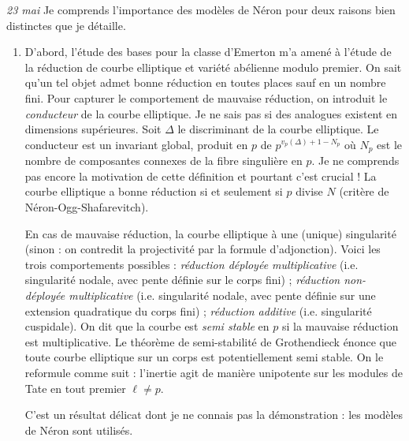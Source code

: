 \documentclass[11.8pt]{amsart}
\theoremstyle{plain}
\theoremstyle{definition}
\theoremstyle{remark}
\begin{document}
\textsl{23 mai} \quad Je comprends l'importance des modèles de Néron pour deux raisons bien distinctes que je détaille. \begin{enumerate}
\item D'abord, l'étude des bases pour la classe d'Emerton m'a amené à l'étude de la réduction de courbe elliptique et variété abélienne modulo premier. On sait qu'un tel objet admet bonne réduction en toutes places sauf en un nombre fini. Pour capturer le comportement de mauvaise réduction, on introduit le \textit{conducteur} de la courbe elliptique. Je ne sais pas si des analogues existent en dimensions supérieures. Soit $\Delta$ le discriminant de la courbe elliptique. Le conducteur est un invariant global, produit en $p$ de $p^{v_p(\Delta)+1-N_p}$ où $N_p$ est le nombre de composantes connexes de la fibre singulière en $p$. Je ne comprends pas encore la motivation de cette définition et pourtant c'est crucial ! La courbe elliptique a bonne réduction si et seulement si $p$ divise $N$ (critère de Néron-Ogg-Shafarevitch).

En cas de mauvaise réduction, la courbe elliptique à une (unique) singularité (sinon : on contredit la projectivité par la formule d'adjonction). Voici les trois comportements possibles : \textit{réduction déployée multiplicative} (i.e. singularité nodale, avec pente définie sur le corps fini) ; \textit{réduction non-déployée multiplicative} (i.e. singularité nodale, avec pente définie sur une extension quadratique du corps fini) ; \textit{réduction additive} (i.e. singularité cuspidale). On dit que la courbe est \textit{semi stable} en $p$ si la mauvaise réduction est multiplicative. Le théorème de semi-stabilité de Grothendieck énonce que toute courbe elliptique sur un corps est potentiellement semi stable. On le reformule comme suit : l'inertie agit de manière unipotente sur les modules de Tate en tout premier $\ell\ne p$. 

C'est un résultat délicat dont je ne connais pas la démonstration : les modèles de Néron sont utilisés.


\end{enumerate}
\end{document}
